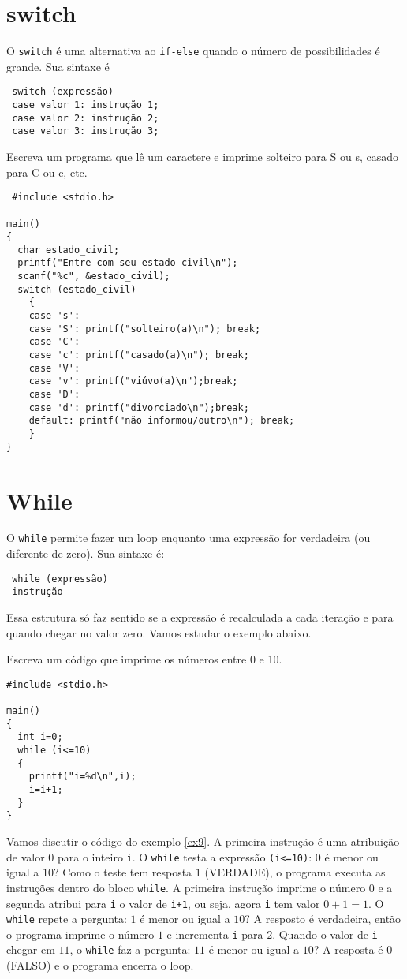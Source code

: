 \section{switch}
O \verb|switch| é uma alternativa ao \verb|if-else| quando o número de possibilidades é grande. Sua sintaxe é 
\begin{verbatim}
 switch (expressão)
 case valor 1: instrução 1;
 case valor 2: instrução 2;
 case valor 3: instrução 3;
\end{verbatim}
\begin{ex}\label{ex8}Escreva um programa que lê um caractere e imprime solteiro para S ou s, casado para C ou c, etc.
\end{ex}
\begin{verbatim}
 #include <stdio.h>

main()
{
  char estado_civil;
  printf("Entre com seu estado civil\n");
  scanf("%c", &estado_civil);
  switch (estado_civil)
    {
    case 's':
    case 'S': printf("solteiro(a)\n"); break;
    case 'C': 
    case 'c': printf("casado(a)\n"); break;
    case 'V': 
    case 'v': printf("viúvo(a)\n");break;
    case 'D': 
    case 'd': printf("divorciado\n");break;
    default: printf("não informou/outro\n"); break;
    }
}
\end{verbatim}


\section{While}
O \verb|while| permite fazer um loop enquanto uma expressão for verdadeira (ou diferente de zero). Sua sintaxe é: 
\begin{verbatim}
 while (expressão)
 instrução 
\end{verbatim}
Essa estrutura só faz sentido se a expressão é recalculada a cada iteração e para quando chegar no valor zero. Vamos estudar o exemplo abaixo.
\begin{ex}\label{ex9}
 Escreva um código que imprime os números entre 0 e 10.
\end{ex}
\begin{verbatim}
#include <stdio.h>

main()
{
  int i=0;
  while (i<=10)
  {
    printf("i=%d\n",i);
    i=i+1;
  }
} 
\end{verbatim}
Vamos discutir o código do exemplo \ref{ex9}. A primeira instrução é uma atribuição de valor $0$ para o inteiro \verb|i|. O \verb|while| testa a expressão \verb|(i<=10)|: $0$ é menor ou igual a $10$? Como o teste tem resposta $1$ (VERDADE), o programa executa as instruções dentro do bloco \verb|while|. A primeira instrução imprime o número $0$ e a segunda atribui para \verb|i| o valor de \verb|i+1|, ou seja, agora \verb|i| tem valor $0+1=1$. O \verb|while| repete a pergunta: $1$ é menor ou igual a $10$? A resposto é verdadeira, então o programa imprime o número $1$ e incrementa \verb|i| para $2$. Quando o valor de \verb|i| chegar em $11$, o \verb|while| faz a pergunta: $11$ é menor ou igual a $10$? A resposta é $0$ (FALSO) e o programa encerra o loop.

